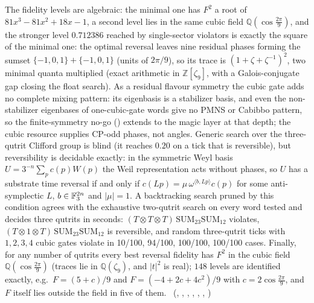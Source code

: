 The fidelity levels are algebraic: the minimal one has $F^2$ a root of $81x^3-81x^2+18x-1$, a second level lies in the
same cubic field $\mathbb Q(\cos\frac{2\pi}{9})$, and the stronger level $0.712386$ reached by single-sector violators is
exactly the square of the minimal one: the optimal reversal leaves nine residual phases forming the sumset
$\{-1,0,1\}+\{-1,0,1\}$ (units of $2\pi/9$), so its trace is $(1+\zeta+\zeta^{-1})^2$, two minimal quanta multiplied
(exact arithmetic in $\mathbb Z[\zeta_9]$, with a Galois-conjugate gap closing the float search). As a residual flavour symmetry the cubic gate
adds no complete mixing pattern: its eigenbasis is a stabilizer basis, and even the non-stabilizer eigenbases of
one-cubic-gate words give no PMNS or Cabibbo pattern, so the finite-symmetry no-go () extends to
the magic layer at that depth; the cubic resource supplies CP-odd phases, not angles. Generic search over the three-qutrit
Clifford group is blind (it reaches $0.20$ on a tick that is reversible), but reversibility is decidable exactly: in
the symmetric Weyl basis $U=3^{-n}\sum_p c(p)W(p)$ the Weil representation acts without phases, so $U$ has a
substrate time reversal if and only if $c(Lp)=\mu\,\omega^{\langle b,Lp\rangle}c(p)$ for some anti-symplectic $L$,
$b\in\mathbb{F}_3^{2n}$ and $|\mu|=1$. A backtracking search pruned by this condition agrees with the exhaustive two-qutrit
search on every word tested and decides three qutrits in seconds: $(T\otimes T\otimes T)\,\mathrm{SUM}_{23}\mathrm{SUM}_{12}$
violates, $(T\otimes1\otimes T)\,\mathrm{SUM}_{23}\mathrm{SUM}_{12}$ is reversible, and random three-qutrit ticks with
$1,2,3,4$ cubic gates violate in 10/100, 94/100, 100/100, 100/100 cases. Finally, for any number of qutrits every best reversal
fidelity has $F^2$ in the cubic field $\mathbb Q(\cos\frac{2\pi}{9})$ (traces lie in $\mathbb Q(\zeta_9)$, and
$|t|^2$ is real); $148$ levels are identified exactly, e.g.\ $F=(5+c)/9$ and $F=(-4+2c+4c^2)/9$ with
$c=2\cos\frac{2\pi}{9}$, and $F$ itself lies outside the field in five of them. \tierC\ (, ,
, ,
, ,
)

